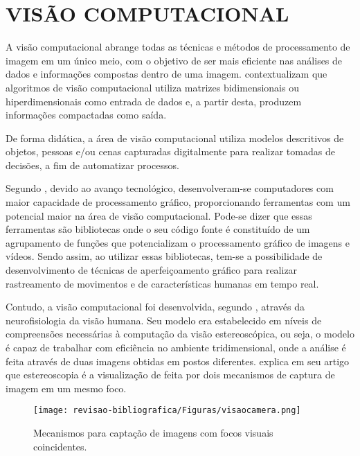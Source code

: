 \section{{VISÃO COMPUTACIONAL}}

A visão computacional abrange todas as técnicas e métodos de processamento de imagem em um único meio, com o objetivo de ser mais eficiente nas análises de dados e informações compostas dentro de uma imagem.  contextualizam que algoritmos de visão computacional utiliza matrizes bidimensionais ou hiperdimensionais como entrada de dados e, a partir desta, produzem informações compactadas como saída.

De forma didática, a área de visão computacional utiliza modelos descritivos de objetos, pessoas e/ou cenas capturadas digitalmente para realizar tomadas de decisões, a fim de automatizar processos.

Segundo , devido ao avanço tecnológico, desenvolveram-se computadores com maior capacidade de processamento gráfico, proporcionando ferramentas com um potencial maior na área de visão computacional. Pode-se dizer que essas ferramentas são bibliotecas onde o seu código fonte é constituído de um agrupamento de funções que potencializam o processamento gráfico de imagens e vídeos. Sendo assim, ao utilizar essas bibliotecas, tem-se a possibilidade de desenvolvimento de técnicas de aperfeiçoamento gráfico para realizar rastreamento de movimentos e de características humanas em tempo real.

Contudo, a visão computacional foi desenvolvida, segundo , através da neurofisiologia da visão humana. Seu modelo era estabelecido em níveis de compreensões necessárias à computação da visão estereoscópica, ou seja, o modelo é capaz de trabalhar com eficiência no ambiente tridimensional, onde a análise é feita através de duas imagens obtidas em postos diferentes.  explica em seu artigo que estereoscopia é a visualização de feita por dois mecanismos de captura de imagem em um mesmo foco.


\begin{figure}[!htb]
\caption{{\footnotesize Mecanismos para captação de imagens com focos visuais coincidentes.}}
 
\centering %
\texttt{[image: revisao-bibliografica/Figuras/visaocamera.png]}%
\label{figura:figura9}

\centering {}
{
\label{figura:figura9}
}
\end{figure}

